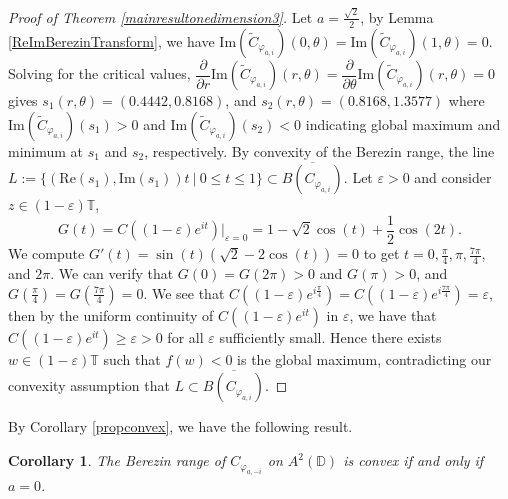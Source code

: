 \documentclass{amsart}
\newtheorem{corollary}{Corollary}
\theoremstyle{remark}
\begin{document}
\begin{proof}[Proof of Theorem \ref{mainresultonedimension3}]
Let $a=\frac{\sqrt{2}}{2}$, by Lemma \ref{ReImBerezinTransform}, we have $\mathrm{Im}(\widetilde{C}_{\varphi_{a,i}})(0,\theta)=\mathrm{Im}(\widetilde{C}_{\varphi_{a,i}})(1,\theta)=0$. Solving for the critical values, $\dfrac{\partial}{\partial r}\mathrm{Im}(\widetilde{C}_{\varphi_{a,i}})(r,\theta)=\dfrac{\partial}{\partial \theta}\mathrm{Im}(\widetilde{C}_{\varphi_{a,i}})(r,\theta)=0$ gives $s_1(r,\theta)=(0.4442,0.8168)$, and $s_2(r,\theta)=(0.8168,1.3577)$ where $\mathrm{Im}(\widetilde{C}_{\varphi_{a,i}})(s_1)>0$ and $\mathrm{Im}(\widetilde{C}_{\varphi_{a,i}})(s_2)<0$ indicating global maximum and minimum at $s_1$ and $s_2$, respectively. 
By convexity of the Berezin range, the line $L:= \{(\mathrm{Re}(s_1),\mathrm{Im}(s_1))t\ |\ 0 \leq t \leq 1\} \subset \overline{B(C_{\varphi_{a,i}})}$. Let $\varepsilon >0$ and consider $z \in (1-\varepsilon)\mathbb{T}$, \[G(t)=C\left((1-\varepsilon)e^{it}\right)|_{\varepsilon=0}=1-\sqrt{2}\cos(t)+\dfrac{1}{2}\cos(2t).\]
We compute $G'(t)=\sin(t)\left(\sqrt{2}-2\cos(t)\right)=0$ to get $t=0,\frac{\pi}{4},\pi, \frac{7\pi}{4}$, and $2\pi$. We can verify that $G(0)=G(2\pi)>0$ and $G(\pi)>0$, and $G\left(\frac{\pi}{4}\right)=G\left(\frac{7\pi}{4}\right)=0$. We see that $C((1-\varepsilon)e^{i\frac{\pi}{4}})=C((1-\varepsilon)e^{i\frac{7\pi}{4}})=\varepsilon$, then by the uniform continuity of $C\left((1-\varepsilon)e^{it}\right)$ in $\varepsilon$, we have that
$C\left((1-\varepsilon)e^{it}\right) \geq \varepsilon > 0$ for all $\varepsilon$ sufficiently small. Hence there exists $w \in (1-\varepsilon)\mathbb{T}$ such that $f(w) < 0$ is the global maximum, contradicting our convexity assumption that $L \subset \overline{B(C_{\varphi_{a,i}})}$.
\end{proof}
By Corollary \ref{propconvex}, we have the following result.
\begin{corollary}
The Berezin range of 
$C_{\varphi_{a,-i}}$ on $A^2(\mathbb{D})$ is convex if and only if $a=0$.
\end{corollary}
\end{document}
